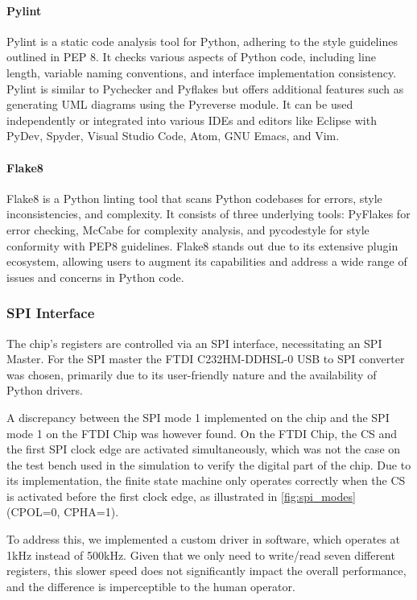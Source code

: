 \paragraph{Pylint}
\label{par:Pylint}
Pylint is a static code analysis tool for Python, adhering to the style guidelines outlined in PEP 8. It checks various aspects of Python code, including line length, variable naming conventions, and interface implementation consistency. Pylint is similar to Pychecker and Pyflakes but offers additional features such as generating UML diagrams using the Pyreverse module. It can be used independently or integrated into various IDEs and editors like Eclipse with PyDev, Spyder, Visual Studio Code, Atom, GNU Emacs, and Vim\cite{Wikipedia:Pylint}.

\paragraph{Flake8}
\label{Par:Flake8}
Flake8 is a Python linting tool that scans Python codebases for errors, style inconsistencies, and complexity. It consists of three underlying tools: PyFlakes for error checking, McCabe for complexity analysis, and pycodestyle for style conformity with PEP8 guidelines. Flake8 stands out due to its extensive plugin ecosystem, allowing users to augment its capabilities and address a wide range of issues and concerns in Python code\cite{flake8}.


\subsubsection{SPI Interface}
\label{subsubsec:SPI}
The chip's registers are controlled via an SPI interface, necessitating an SPI Master. For the SPI master the FTDI C232HM-DDHSL-0 USB to SPI converter was chosen, primarily due to its user-friendly nature and the availability of Python drivers. 

A discrepancy between the SPI mode 1 implemented on the chip and the SPI mode 1 on the FTDI Chip was however found. On the FTDI Chip, the CS and the first SPI clock edge are activated simultaneously, which was not the case on the test bench used in the simulation to verify the digital part of the chip. Due to its implementation, the finite state machine only operates correctly when the CS is activated before the first clock edge, as illustrated in \autoref{fig:spi_modes} (CPOL=0, CPHA=1). 

To address this, we implemented a custom driver in software, which operates at 1kHz instead of 500kHz. Given that we only need to write/read seven different registers, this slower speed does not significantly impact the overall performance, and the difference is imperceptible to the human operator. 

